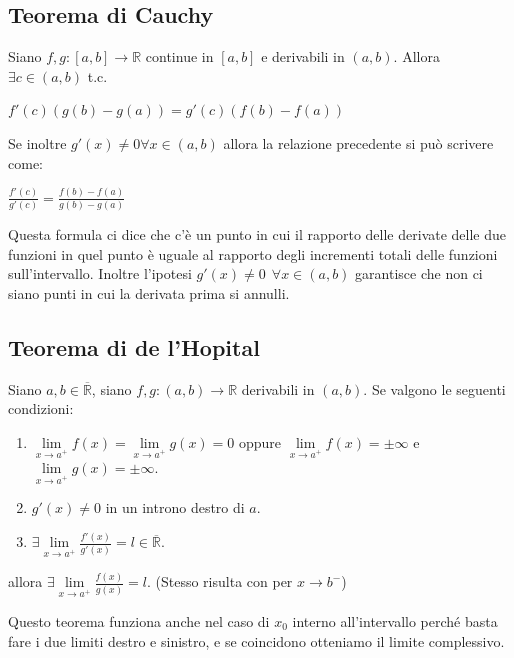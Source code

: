 \subsection{Teorema di Cauchy}
\begin{theorem}
    Siano $f,g: [a,b] \to \mathbb{R}$ continue in $[a,b]$ e derivabili in $(a,b)$. Allora $\exists c \in (a,b)$ t.c.
    \begin{center}
        $f'(c)(g(b) - g(a)) = g'(c)(f(b) - f(a))$
    \end{center}
    Se inoltre $g'(x) \neq 0 \forall x \in (a,b)$ allora la relazione precedente si può scrivere come:
    \begin{center}
        $\frac{f'(c)}{g'(c)} = \frac{f(b) - f(a)}{g(b) - g(a)}$
    \end{center}
\end{theorem}
Questa formula ci dice che c'è un punto in cui il rapporto delle derivate delle due funzioni in quel punto è uguale al rapporto degli incrementi totali delle funzioni sull'intervallo. Inoltre l'ipotesi $g'(x) \neq 0 \: \: \forall x \in (a,b)$ garantisce che non ci siano punti in cui la derivata prima si annulli.


\subsection{Teorema di de l'Hopital}
\begin{theorem}
    Siano $a,b \in \overline{\mathbb{R}}$, siano $f,g: (a,b) \to \mathbb{R}$ derivabili in $(a,b)$. Se valgono le seguenti condizioni:
    \begin{enumerate}
        \item $\lim\limits_{x\to a^+}f(x) = \lim\limits_{x\to a^+}g(x) = 0$ oppure $\lim\limits_{x\to a^+}f(x) = \pm\infty$ e $\lim\limits_{x\to a^+}g(x) = \pm\infty$.
        \item $g'(x) \neq 0$ in un introno destro di $a$.
        \item $\exists \lim\limits_{x\to a^+}\frac{f'(x)}{g'(x)} = l \in \overline{\mathbb{R}}$.
    \end{enumerate}
    allora $\exists \lim\limits_{x\to a^+}\frac{f(x)}{g(x)} = l$. (Stesso risulta con per $x \to b^-$)
\end{theorem}

\begin{note}
Questo teorema funziona anche nel caso di $x_0$ interno all'intervallo perché basta fare i due limiti destro e sinistro, e se coincidono otteniamo il limite complessivo.
\end{note}

